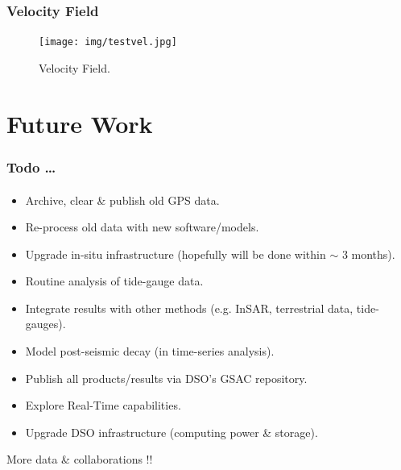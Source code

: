 \documentclass{beamer}
\begin{document}
\begin{frame}\frametitle{Velocity Field}\framesubtitle{}

    \begin{figure}
        \begin{center}
        \texttt{[image: img/testvel.jpg]}
        \caption{Velocity Field.}
        \label{fig:mits}
        \end{center}
    \end{figure}

\end{frame}

\section{Future Work}
\begin{frame}\frametitle{Todo \dots}\framesubtitle{}

    \begin{itemize}
        \item Archive, clear \& publish old GPS data.
        \item Re-process old data with new software/models.
        \item Upgrade in-situ infrastructure (hopefully will be done within $\sim$ 3 months).
        \item Routine analysis of tide-gauge data.
        \item Integrate results with other methods (e.g. InSAR, terrestrial data, tide-gauges)\footnotemark.
        \item Model post-seismic decay (in time-series analysis).
        \item Publish all products/results via DSO's GSAC repository.
        \item Explore Real-Time capabilities.
        \item Upgrade DSO infrastructure (computing power \& storage).
    \end{itemize}

    \begin{block}{}
        \begin{center}
        More data \& collaborations !!
        \end{center}
    \end{block}

\end{frame}
\end{document}
